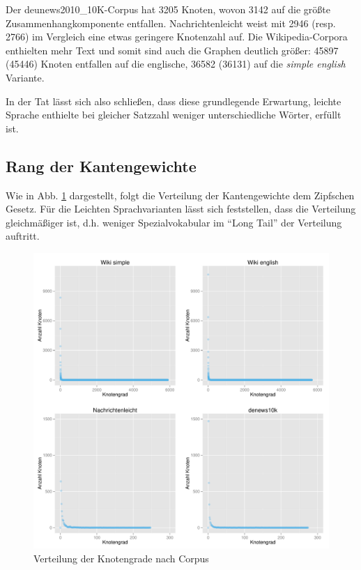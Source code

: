 \documentclass[11pt, a4paper]{article}
\begin{document}
Der deunews2010\_10K-Corpus hat 3205 Knoten, wovon 3142 auf die größte
Zusammenhangkomponente entfallen.
Nachrichtenleicht weist mit 2946 (resp. 2766) im Vergleich eine etwas geringere
Knotenzahl auf.
Die Wikipedia-Corpora enthielten mehr Text und somit sind auch die Graphen
deutlich größer: 45897 (45446) Knoten entfallen auf die englische, 36582 (36131)
auf die \emph{simple english} Variante.

In der Tat l\"asst sich also schlie\ss{}en, dass diese grundlegende Erwartung,
leichte Sprache enthielte bei gleicher Satzzahl weniger unterschiedliche Wörter,
erf\"ullt ist.

\subsection{Rang der Kantengewichte}

Wie in Abb. \ref{fig-vdeg} dargestellt, folgt die Verteilung der Kantengewichte
dem Zipfschen Gesetz.
F\"ur die Leichten Sprachvarianten l\"asst sich feststellen, dass die Verteilung
gleichm\"a\ss{}iger ist, d.h. weniger Spezialvokabular im "`Long Tail"' der
Verteilung auftritt.

\begin{figure}[ht]
    \centering
        \includegraphics[scale=.5]{vdeg_plots.pdf}
    \caption{Verteilung der Knotengrade nach Corpus}
    \label{fig-vdeg}
\end{figure}
\end{document}
